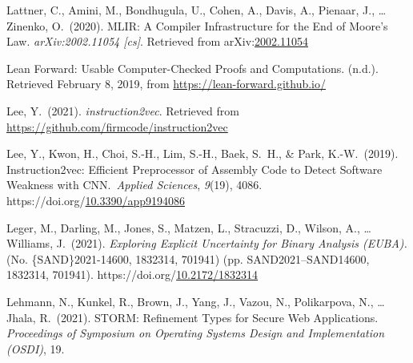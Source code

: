 \documentclass[12pt,twoside]{article}
\begin{document}
{\begin{thebibliography}{1079}
\mdbibitemlabel{}Lattner, C., Amini, M., Bondhugula, U., Cohen, A., Davis, A., Pienaar, J., … Zinenko, O.~(2020). MLIR: A Compiler Infrastructure for the End of Moore’s Law. \emph{arXiv:2002.11054 {}[cs]}. Retrieved from arXiv:\href{http://arxiv.org/abs/2002.11054}{2002.11054}%

\mdbibitemlabel{}Lean Forward: Usable Computer-Checked Proofs and Computations. (n.d.). Retrieved February 8, 2019, from \href{https://lean-forward.github.io/}{{\ttfamily https://\hspace{0pt}lean-\hspace{0pt}forward.\hspace{0pt}github.\hspace{0pt}io/\hspace{0pt}}}%

\mdbibitemlabel{}Lee, Y.~(2021). \emph{instruction2vec}. Retrieved from \href{https://github.com/firmcode/instruction2vec}{{\ttfamily https://\hspace{0pt}github.\hspace{0pt}com/\hspace{0pt}firmcode/\hspace{0pt}instruction2vec}}%

\mdbibitemlabel{}Lee, Y., Kwon, H., Choi, S.-H., Lim, S.-H., Baek, S.~H., \& Park, K.-W.~(2019). Instruction2vec: Efficient Preprocessor of Assembly Code to Detect Software Weakness with CNN.~\emph{Applied Sciences}, \emph{9}(19), 4086. https://doi.org/\href{https://dx.doi.org/10.3390/app9194086}{10.3390/app9194086}%

\mdbibitemlabel{}Leger, M., Darling, M., Jones, S., Matzen, L., Stracuzzi, D., Wilson, A., … Williams, J.~(2021). \emph{Exploring Explicit Uncertainty for Binary Analysis (EUBA).} (No. \{SAND\}2021-14600, 1832314, 701941) (pp. SAND2021–SAND14600, 1832314, 701941). https://doi.org/\href{https://dx.doi.org/10.2172/1832314}{10.2172/1832314}%

\mdbibitemlabel{}Lehmann, N., Kunkel, R., Brown, J., Yang, J., Vazou, N., Polikarpova, N., … Jhala, R.~(2021). STORM: Reﬁnement Types for Secure Web Applications. \emph{Proceedings of Symposium on Operating Systems Design and Implementation (OSDI)}, 19.%


\end{thebibliography}}
\end{document}
